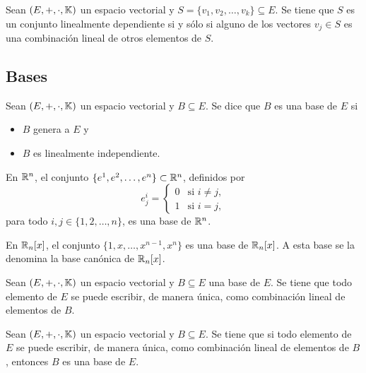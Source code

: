 \documentclass[a4,11pt]{aleph-notas}
\begin{document}
\begin{teo}
    Sean $(E,+,\cdot,\mathbb{K})$ un espacio vectorial y $S=\{v_1,v_2,\ldots,v_k\}\subseteq E$. Se tiene que $S$ es un conjunto linealmente dependiente si y sólo si alguno de los vectores $v_j\in S$ es una combinación lineal de otros elementos de $S$.
\end{teo}

\subsection{Bases}

\begin{defi}
    Sean $(E,+,\cdot,\mathbb{K})$ un espacio vectorial y $B\subseteq E$. Se dice que $B$ es una base de $E$ si 
    \begin{itemize}
        \item $B$ genera a $E$ y 
        \item $B$ es linealmente independiente. 
    \end{itemize}
\end{defi}


\begin{teo}
    En $\mathbb{R}^n$, el conjunto $\{e^1,e^2,\ldots,e^n\}\subset\mathbb{R}^n$, definidos por 
    \[
        e^i_j=
        \begin{cases}
            0& \text{si }i\neq j,\\
            1& \text{si }i= j,
        \end{cases}
    \]
    para todo $i,j\in\{1,2,\ldots,n\}$, es una base de $\mathbb{R}^n$.
\end{teo}

\begin{teo}
    En $\mathbb{R}_n[x]$, el conjunto $\{1,x,\ldots,x^{n-1},x^n\}$ es una base de $\mathbb{R}_n[x]$. A esta base se la denomina la base canónica de $\mathbb{R}_n[x]$.
\end{teo}

\begin{teo}
    Sean $(E,+,\cdot,\mathbb{K})$ un espacio vectorial y $B\subseteq E$ una base de $E$. Se tiene que todo elemento de $E$ se puede escribir, de manera única, como combinación lineal de elementos de $B$.
\end{teo}

\begin{teo}
    Sean $(E,+,\cdot,\mathbb{K})$ un espacio vectorial y $B\subseteq E$. Se tiene que si todo elemento de $E$ se puede escribir, de manera única, como combinación lineal de elementos de $B$, entonces $B$ es una base de $E$.
\end{teo}
\end{document}
